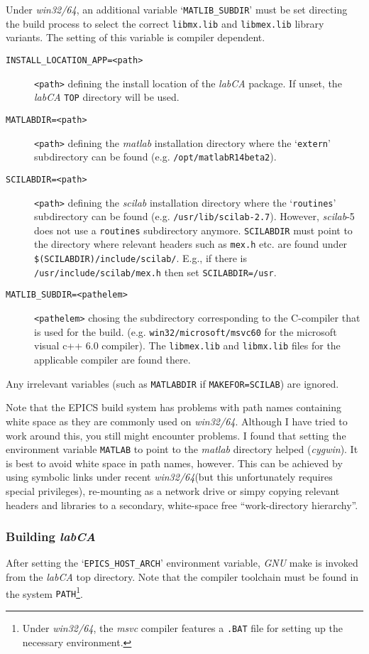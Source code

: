\documentclass{article}
\newcommand{\sca}{\ita{labCA}}
\newcommand{\scilab}{\ita{scilab}}
\newcommand{\matlab}{\ita{matlab}}
\newcommand{\windoze}{\ita{win32/64}}
\newcommand{\com}[1]{{\tt #1}}
\newcommand{\ita}[1]{\emph{#1}}
\begin{document}
\begin{description}
Under \windoze{}, an additional variable
`\com{MATLIB\_SUBDIR}' must be set directing the build process to select the correct
\com{libmx.lib} and \com{libmex.lib} library variants. The setting of this variable
is compiler dependent.
\begin{description}
\item[\tt INSTALL\_LOCATION\_APP=<path>] \com{<path>} defining the
install location of the \sca{} package. If unset, the \sca{} \com{TOP}
directory will be used.
\item[\tt MATLABDIR=<path>] \com{<path>} defining the \matlab{} installation
directory where the `\com{extern}' subdirectory can be found (e.g.
\com{/opt/matlabR14beta2}).
\item[\tt SCILABDIR=<path>] \com{<path>} defining the \scilab{} installation
directory where the `\com{routines}' subdirectory can be found (e.g.
\com{/usr/lib/scilab-2.7}). However, \scilab{}-5 does not use a \com{routines}
subdirectory anymore. {\tt SCILABDIR} must point to the directory where
relevant headers such as {\tt mex.h} etc. are found under
{\tt \$(SCILABDIR)/include/scilab/}. E.g., if there is {\tt /usr/include/scilab/mex.h} then set {\tt SCILABDIR=/usr}.
\item[\tt MATLIB\_SUBDIR=<pathelem>] \com{<pathelem>} chosing the subdirectory
corresponding to the C-compiler that is used for the build. (e.g. 
\com{win32/microsoft/msvc60} for the microsoft visual c++ 6.0 compiler).
The \com{libmex.lib} and \com{libmx.lib} files for the applicable compiler
are found there.
\end{description}
\end{description}
Any irrelevant variables (such as \com{MATLABDIR} if \com{MAKEFOR=SCILAB})
are ignored.

Note that the EPICS build system has problems with path names containing
white space as they are commonly used on \windoze. Although I have
tried to work around this, you still might encounter problems. I found
that setting the environment variable \com{MATLAB} to point to the \matlab{}
directory helped (\ita{cygwin}). It is best to avoid white space in path
names, however. This can be achieved by using symbolic links under recent
\windoze (but this unfortunately requires special privileges), re-mounting
as a network drive or simpy copying relevant headers and libraries
to a secondary, white-space free ``work-directory hierarchy''.

\subsubsection{Building \sca}
After setting the
`\com{EPICS\_HOST\_ARCH}' environment variable, \ita{GNU} make is invoked from the \sca{} top 
directory. Note that the compiler toolchain must be found in the system
\com{PATH}\footnote{
Under \windoze, the \ita{msvc} compiler features a \com{.BAT} file for
setting up the necessary environment.
}.
\end{document}
